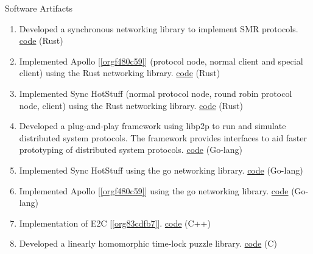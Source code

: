 \documentclass{resume}
\begin{document}
\begin{rSection}{Software Artifacts}
\label{sec:org78f4225}
\begin{enumerate}
\item Developed a synchronous networking library to implement SMR protocols. \href{https://github.cowwm/adithyabhatkajake/libchatter-rs}{code}  \hfill  (Rust)
\item Implemented Apollo [\ref{orgf480c59}] (protocol node, normal client and special client) using the Rust networking library. \href{https://github.com/adithyabhatkajake/libchatter-rs}{code}  \hfill  (Rust)
\item Implemented Sync HotStuff (normal protocol node, round robin protocol node, client) using the Rust networking library. \href{https://github.com/adithyabhatkajake/libchatter-rs}{code}  \hfill  (Rust)
\item Developed a plug-and-play framework using libp2p to run and simulate distributed system protocols. The framework provides interfaces to aid faster prototyping of distributed system protocols. \href{https://github.com/adithyabhatkajake/libchatter/}{code}  \hfill  (Go-lang)
\item Implemented Sync HotStuff using the go networking library. \href{https://github.com/adithyabhatkajake/libsynchs}{code}  \hfill  (Go-lang)
\item Implemented Apollo [\ref{orgf480c59}] using the go networking library. \href{https://github.com/adithyabhatkajake/libapollo}{code}  \hfill  (Go-lang)
\item Implementation of E2C [\ref{org83cdfb7}]. \href{https://github.com/adithyabhatkajake/libe2c-cpp}{code}  \hfill  (C++)
\item Developed a linearly homomorphic time-lock puzzle library. \href{https://github.com/verifiable-timed-signatures/liblhtlp}{code}  \hfill  (C)
\end{enumerate}
\end{rSection}
\end{document}
